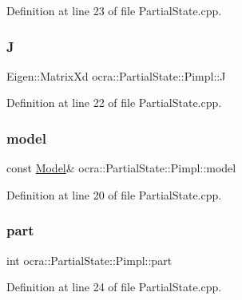 Definition at line 23 of file Partial\+State.\+cpp.

\hypertarget{structocra_1_1PartialState_1_1Pimpl_a7c31cf81faa6abbbe780b9f143094418}{}\label{structocra_1_1PartialState_1_1Pimpl_a7c31cf81faa6abbbe780b9f143094418} 
\subsubsection{\texorpdfstring{J}{J}}
{\footnotesize\ttfamily Eigen\+::\+Matrix\+Xd ocra\+::\+Partial\+State\+::\+Pimpl\+::J}



Definition at line 22 of file Partial\+State.\+cpp.

\hypertarget{structocra_1_1PartialState_1_1Pimpl_a45e5572b9e9cbe6ac2d9ba4107a58bd6}{}\label{structocra_1_1PartialState_1_1Pimpl_a45e5572b9e9cbe6ac2d9ba4107a58bd6} 
\subsubsection{\texorpdfstring{model}{model}}
{\footnotesize\ttfamily const \hyperlink{classocra_1_1Model}{Model}\& ocra\+::\+Partial\+State\+::\+Pimpl\+::model}



Definition at line 20 of file Partial\+State.\+cpp.

\hypertarget{structocra_1_1PartialState_1_1Pimpl_a605a55abed1d170fa6911088fefa7337}{}\label{structocra_1_1PartialState_1_1Pimpl_a605a55abed1d170fa6911088fefa7337} 
\subsubsection{\texorpdfstring{part}{part}}
{\footnotesize\ttfamily int ocra\+::\+Partial\+State\+::\+Pimpl\+::part}



Definition at line 24 of file Partial\+State.\+cpp.

\hypertarget{structocra_1_1PartialState_1_1Pimpl_ac60f12a932c9bac309b2c1794de57a9c}{}\label{structocra_1_1PartialState_1_1Pimpl_ac60f12a932c9bac309b2c1794de57a9c} 
